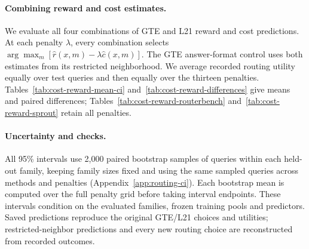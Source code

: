 \paragraph{Combining reward and cost estimates.}
We evaluate all four combinations of GTE and L21 reward and cost predictions.
At each penalty $\lambda$, every combination selects $\arg\max_m[\widehat r(x,m)-\lambda\widehat c(x,m)]$.
The GTE answer-format control uses both estimates from its restricted neighborhood.
We average recorded routing utility equally over test queries and then equally over the thirteen penalties.
Tables~\ref{tab:cost-reward-mean-ci} and~\ref{tab:cost-reward-differences} give means and paired differences; Tables~\ref{tab:cost-reward-routerbench} and~\ref{tab:cost-reward-sprout} retain all penalties.

\paragraph{Uncertainty and checks.}
All 95\% intervals use 2,000 paired bootstrap samples of queries within each held-out family, keeping family sizes fixed and using the same sampled queries across methods and penalties (Appendix~\ref{app:routing-ci}).
Each bootstrap mean is computed over the full penalty grid before taking interval endpoints.
These intervals condition on the evaluated families, frozen training pools and predictors.
Saved predictions reproduce the original GTE/L21 choices and utilities; restricted-neighbor predictions and every new routing choice are reconstructed from recorded outcomes.

